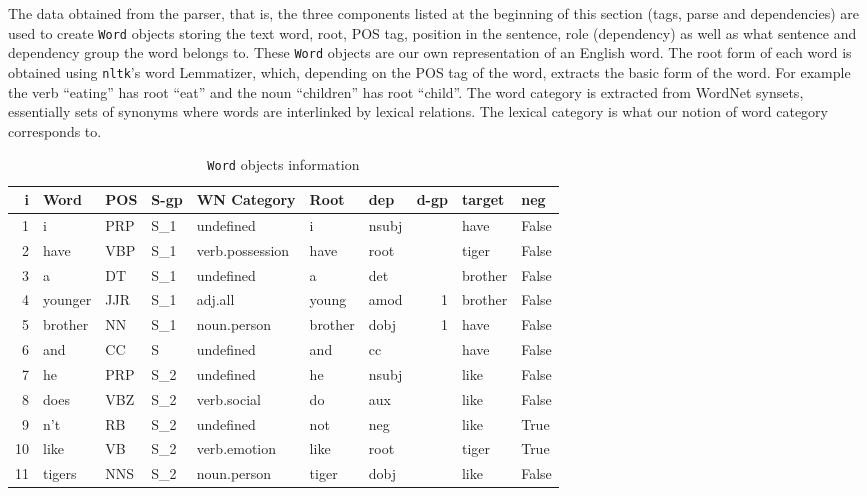\documentclass[12pt]{ociamthesis}  %
\newcommand{\tech}{\texttt}
\begin{document}
The data obtained from the parser, that is, the three components listed at the beginning of this section (tags, parse and dependencies) are used to create \texttt{Word} objects storing the text word, root, POS tag, position in the sentence, role (dependency) as well as what sentence and dependency group the word belongs to. These \texttt{Word} objects are our own representation of an English word. The root form of each word is obtained using \tech{nltk}'s word Lemmatizer, which, depending on the POS tag of the word, extracts the basic form of the word. For example the verb ``eating'' has root ``eat'' and the noun ``children'' has root ``child''. The word category is extracted from WordNet synsets, essentially sets of synonyms where words are interlinked by lexical relations. The lexical category is what our notion of word category corresponds to.
\begin{table}[H]
\center
\small
\begin{tabular}{rllllllrll}
\hline
 i       & Word   & POS   & S-gp         & WN Category   & Root   &   dep & d-gp   &   target &    neg \\
\hline
  1 & i       & PRP    & S\_1   & undefined       & i             & nsubj  &       & have        &          False         \\
  2 & have    & VBP    & S\_1   & verb.possession & have          & root   &       & tiger       &          False         \\
  3 & a       & DT     & S\_1   & undefined       & a             & det    &       & brother     &          False        \\
  4 & younger & JJR    & S\_1   & adj.all         & young         & amod   &     1 & brother     &          False         \\
  5 & brother & NN     & S\_1   & noun.person     & brother       & dobj   &     1 & have        &          False         \\
  6 & and     & CC     & S     & undefined       & and           & cc     &       & have        &           False         \\
  7 & he      & PRP    & S\_2   & undefined       & he            & nsubj  &       & like        &          False         \\
  8 & does    & VBZ    & S\_2   & verb.social     & do            & aux    &       & like        &          False         \\
  9 & n't     & RB     & S\_2   & undefined       & not           & neg    &       & like        &           True          \\
 10 & like    & VB     & S\_2   & verb.emotion    & like          & root   &       & tiger       &           True          \\
 11 & tigers  & NNS    & S\_2   & noun.person     & tiger         & dobj   &       & like        &          False         \\
\hline
\end{tabular}
\caption{\texttt{Word} objects information}
\label{table:word-obj}
\end{table}
\end{document}

